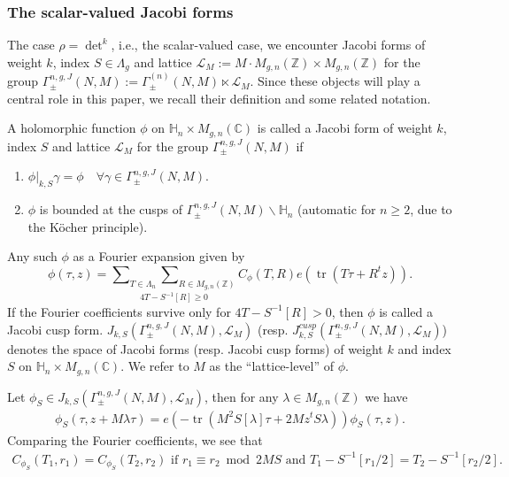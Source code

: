 \documentclass[11pt]{amsart}
\numberwithin{equation}{section}
\newcommand{\mbb}{\mathbb}
\newcommand{\mc}{\mathcal}
\DeclareMathOperator{\tr}{tr}
\newcommand{\z}{\mathbb{Z}}
\newcommand{\hn}{\mbb H_n}
\newcommand{\q}{\quad}
\newcommand{\sumn}{\sum \nolimits}
\begin{document}
\subsubsection{The scalar-valued Jacobi forms}\label{jacobi-scalar}
The case $\rho=\det^k$, i.e., the scalar-valued case, we encounter Jacobi forms of weight $k$, index $S\in \Lambda_g$ and lattice $\mc L_M:=M\cdot M_{g,n}(\mbb Z)\times M_{g,n}(\mbb Z)$ for the group $\Gamma^{n,g,J}_\pm(N, M):=\Gamma_\pm^{(n)}(N,M)\ltimes \mc L_M$. Since these objects will play a central role in this paper, we recall their definition and some related notation. 

A holomorphic function $\phi$ on $\hn\times M_{g,n}(\mbb C)$ is called a Jacobi form of weight $k$, index $S$ and lattice $\mc L_M$ for the group $\Gamma^{n,g,J}_\pm(N, M)$ if
\begin{enumerate}
    \item $\phi|_{k,S}\gamma = \phi \q \forall \gamma\in \Gamma^{n,g,J}_\pm(N, M)$.
    \item $\phi$ is bounded at the cusps of $\Gamma^{n,g,J}_\pm(N, M)\backslash \hn$ (automatic for $n\ge 2$, due to the K\"{o}cher principle).
\end{enumerate}

Any such $\phi$ as a Fourier expansion given by
\begin{equation}\label{jacobiFE}
    \phi(\tau,z)=\underset{4T-S^{-1}[R]\ge 0}{\sumn_{T\in \Lambda_n}\sumn_{R\in M_{g,n}(\z)}}C_\phi(T,R) e(\tr (T\tau+R^tz)).
\end{equation}
If the Fourier coefficients survive only for $4T-S^{-1}[R]>0$, then $\phi$ is called a Jacobi cusp form. $J_{k, S}(\Gamma^{n,g,J}_\pm(N, M), \mc L_M)$ (resp. $J^{cusp}_{k, S}(\Gamma^{n,g,J}_\pm(N, M),\mc L_M)$) denotes the space of Jacobi forms (resp. Jacobi cusp forms) of weight $k$ and index $S$ on $\hn \times M_{g,n}(\mbb C)$. We refer to $M$ as the ``lattice-level'' of $\phi$.

Let $\phi_S\in J_{k, S}(\Gamma_\pm^{n,g,J}(N,M), \mc L_M)$, then for any $\lambda\in M_{g,n}(\mbb Z)$ we have
\begin{align}
   \phi_S(\tau, z+M\lambda \tau)=  e(-\tr(M^2S[\lambda]\tau+2Mz^tS\lambda)) \phi_S(\tau,z).
\end{align}
Comparing the Fourier coefficients, we see that 
\begin{align} \label{fc-equiv}
 C_{\phi_S}(T_1, r_1)=C_{\phi_S}(T_2, r_2)   \text{ if } r_1\equiv r_2\bmod 2MS \text{ and } T_1-S^{-1}[r_1/2]=T_2-S^{-1}[r_2/2] .
\end{align} 
\end{document}
